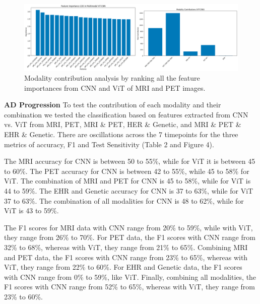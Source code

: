   \begin{figure}
     \centering
     \includegraphics[width=1\linewidth]{figs/Picture16.png}
     \caption{Modality contribution analysis by ranking all the feature importances from CNN and ViT of MRI and PET images. }
    \label{fig:enter-label}
 \end{figure}
 
\textbf{AD Progression}
To test the contribution of each modality and their combination we tested the classification based on features extracted from CNN vs. ViT from MRI, PET, MRI \& PET, HER \& Genetic, and MRI \& PET \& EHR \& Genetic. There are oscillations across the 7 timepoints for the three metrics of accuracy, F1 and Test Sensitivity (Table 2 and Figure 4).  

The MRI accuracy for CNN is between 50 to 55\%, while for ViT it is between 45 to 60\%. The PET accuracy for CNN is between 42 to 55\%, while 45 to 58\% for ViT. The combination of MRI and PET for CNN is 45 to 58\%, while for ViT is 44 to 59\%. The EHR and Genetic accuracy for CNN is 37 to 63\%, while for ViT 37 to 63\%. The combination of all modalities for CNN is 48 to 62\%, while for ViT is 43 to 59\%.  

The F1 scores for MRI data with CNN range from 20\% to 59\%, while with ViT, they range from 26\% to 70\%. For PET data, the F1 scores with CNN range from 32\% to 68\%, whereas with ViT, they range from 21\% to 65\%. Combining MRI and PET data, the F1 scores with CNN range from 23\% to 65\%, whereas with ViT, they range from 22\% to 60\%. For EHR and Genetic data, the F1 scores with CNN range from 0\% to 59\%, like ViT. Finally, combining all modalities, the F1 scores with CNN range from 52\% to 65\%, whereas with ViT, they range from 23\% to 60\%. 

